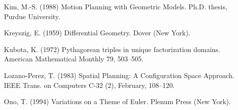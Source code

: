 \begin{thebibliography}{Lozano-Perez 83}
Kim, M.-S. (1988)
Motion Planning with Geometric Models.
Ph.D. thesis, Purdue University.

Kreyszig, E. (1959) Differential Geometry.
Dover (New York).

Kubota, K. (1972) Pythagorean triples in unique factorization domains.
American Mathematical Monthly 79, 503--505.

Lozano-Perez, T. (1983)
Spatial Planning: A Configuration Space Approach.
IEEE Trans. on Computers C-32 (2), February, 108--120.

Ono, T. (1994) Variations on a Theme of Euler.
Plenum Press (New York).

\end{thebibliography}



